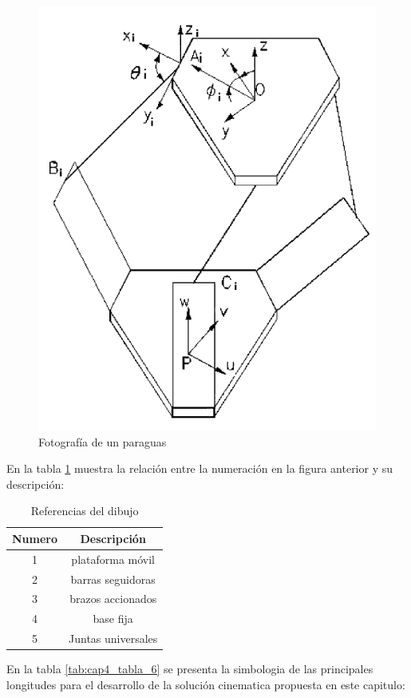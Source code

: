         \begin{figure}[htb]
             \centering
             \includegraphics[width=0.45\linewidth]{Main/Chapter4/Images4/Metodo_A_Modelacion_Cinematica_Posicion_7.png}
              \caption{Fotografía de un paraguas}
              \label{f:Cap4_Metodo_A_Modelacion_Cinematica_Posicion_7}
        \end{figure}
        
        
        En la tabla \ref{tab:cap4_tabla_5} muestra la relación entre la numeración en la figura anterior y su descripción:
        
        \begin{table}[h]
            \centering
            \begin{tabular}{c c}
            \hline
                \textbf{Numero}& \textbf{Descripción} \\ 
            \hline             \hline
             1 & plataforma móvil \\
            \hline
             2 & barras seguidoras \\
            \hline
             3 & brazos accionados \\
            \hline
             4 & base fija\\
            \hline
             5 & Juntas universales \\
             \hline
            \end{tabular}
           \caption{Referencias del dibujo}
           \label{tab:cap4_tabla_5}
        \end{table}
      
    \newpage

      En la tabla \ref{tab:cap4_tabla_6} se presenta la simbologia de las principales longitudes para el desarrollo de la solución cinematica propuesta en este capitulo:

